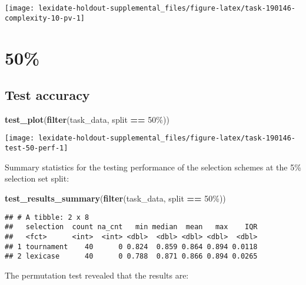 \documentclass[
]{book}
\newenvironment{Shaded}{\begin{snugshade}}{\end{snugshade}}
\newcommand{\FunctionTok}[1]{\textcolor[rgb]{0.13,0.29,0.53}{\textbf{#1}}}
\newcommand{\NormalTok}[1]{#1}
\newcommand{\SpecialCharTok}[1]{\textcolor[rgb]{0.81,0.36,0.00}{\textbf{#1}}}
\newcommand{\StringTok}[1]{\textcolor[rgb]{0.31,0.60,0.02}{#1}}
\begin{document}
\texttt{[image: lexidate-holdout-supplemental\_files/figure-latex/task-190146-complexity-10-pv-1]}

\hypertarget{section-17}{%
\section{50\%}\label{section-17}}

\hypertarget{test-accuracy-17}{%
\subsection{Test accuracy}\label{test-accuracy-17}}

\begin{Shaded}
\begin{Highlighting}[]
\FunctionTok{test\_plot}\NormalTok{(}\FunctionTok{filter}\NormalTok{(task\_data, split }\SpecialCharTok{==} \StringTok{\textquotesingle{}50\%\textquotesingle{}}\NormalTok{))}
\end{Highlighting}
\end{Shaded}

\texttt{[image: lexidate-holdout-supplemental\_files/figure-latex/task-190146-test-50-perf-1]}

Summary statistics for the testing performance of the selection schemes at the 5\% selection set split:

\begin{Shaded}
\begin{Highlighting}[]
\FunctionTok{test\_results\_summary}\NormalTok{(}\FunctionTok{filter}\NormalTok{(task\_data, split }\SpecialCharTok{==} \StringTok{\textquotesingle{}50\%\textquotesingle{}}\NormalTok{))}
\end{Highlighting}
\end{Shaded}

\begin{verbatim}
## # A tibble: 2 x 8
##   selection  count na_cnt   min median  mean   max    IQR
##   <fct>      <int>  <int> <dbl>  <dbl> <dbl> <dbl>  <dbl>
## 1 tournament    40      0 0.824  0.859 0.864 0.894 0.0118
## 2 lexicase      40      0 0.788  0.871 0.866 0.894 0.0265
\end{verbatim}

The permutation test revealed that the results are:
\end{document}
